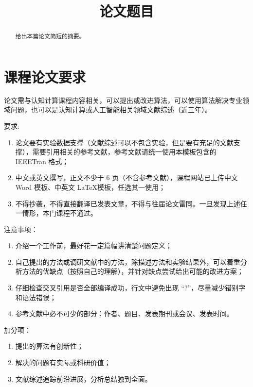 \documentclass[conference]{IEEEtran}
\begin{document}
\title{论文题目}

\author{
}

\maketitle

\begin{abstract}
  给出本篇论文简短的摘要。
\end{abstract}


\section*{课程论文要求}

论文需与认知计算课程内容相关，可以提出或改进算法，可以使用算法解决专业领域问题，也可以是认知计算或人工智能相关领域文献综述（近三年）。

要求:
\begin{enumerate}
  \item 论文要有实验数据支撑（文献综述可以不包含实验，但是要有充足的文献支撑），需要引用相关的参考文献，参考文献请统一使用本模板包含的 IEEETran 格式；
  \item 中文或英文撰写，正文不少于 6 页（不含参考文献），课程网站已上传中文 Word 模板、中英文 \LaTeX 模板，任选其一使用；
  \item 不得抄袭，不得直接翻译已发表文章，不得与往届论文雷同。一旦发现上述任一情形，本门课程不通过。
\end{enumerate}

注意事项：
\begin{enumerate}
  \item 介绍一个工作前，最好花一定篇幅讲清楚问题定义；
  \item 自己提出的方法或调研文献中的方法，除描述方法和实验结果外，可以着重分析方法的优缺点（按照自己的理解），并针对缺点尝试给出可能的改进方案；
  \item 仔细检查交叉引用是否全部编译成功，行文中避免出现 ``?''，尽量减少错别字和语法错误；
  \item 参考文献中必不可少的部分：作者、题目、发表期刊或会议、发表时间。
\end{enumerate}

加分项：
\begin{enumerate}
  \item 提出的算法有创新性；
  \item 解决的问题有实际或科研价值；
  \item 文献综述追踪前沿进展，分析总结独到全面。
\end{enumerate}
\end{document}
